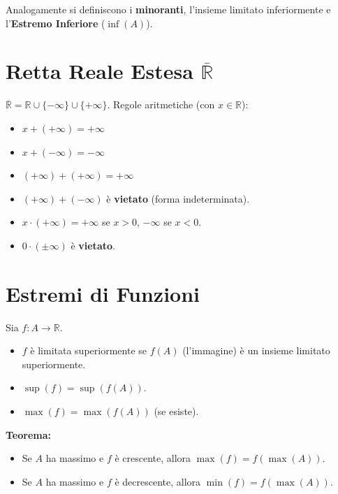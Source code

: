 \documentclass{article}
\begin{document}
Analogamente si definiscono i \textbf{minoranti}, l'insieme limitato inferiormente e l'\textbf{Estremo Inferiore} ($\inf(A)$).

\section*{Retta Reale Estesa $\overline{\mathbb{R}}$}
$\overline{\mathbb{R}} = \mathbb{R} \cup \{-\infty\} \cup \{+\infty\}$.
Regole aritmetiche (con $x \in \mathbb{R}$):
\begin{itemize}
    \item $x + (+\infty) = +\infty$
    \item $x + (-\infty) = -\infty$
    \item $(+\infty) + (+\infty) = +\infty$
    \item $(+\infty) + (-\infty)$ è \textbf{vietato} (forma indeterminata).
    \item $x \cdot (+\infty) = +\infty$ se $x > 0$, $-\infty$ se $x < 0$.
    \item $0 \cdot (\pm \infty)$ è \textbf{vietato}.
\end{itemize}

\section*{Estremi di Funzioni}
Sia $f: A \to \mathbb{R}$.
\begin{itemize}
    \item $f$ è limitata superiormente se $f(A)$ (l'immagine) è un insieme limitato superiormente.
    \item $\sup(f) = \sup(f(A))$.
    \item $\max(f) = \max(f(A))$ (se esiste).
\end{itemize}
\textbf{Teorema:}
\begin{itemize}
    \item Se $A$ ha massimo e $f$ è crescente, allora $\max(f) = f(\max(A))$.
    \item Se $A$ ha massimo e $f$ è decrescente, allora $\min(f) = f(\max(A))$.
\end{itemize}
\end{document}
